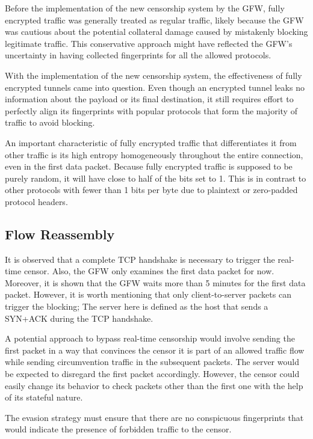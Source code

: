 Before the implementation of the new censorship system by the GFW, fully encrypted traffic was generally treated as regular traffic, likely because the GFW was cautious about the potential collateral damage caused by mistakenly blocking legitimate traffic. This conservative approach might have reflected the GFW's uncertainty in having collected fingerprints for all the allowed protocols.

With the implementation of the new censorship system, the effectiveness of fully encrypted tunnels came into question. Even though an encrypted tunnel leaks no information about the payload or its final destination, it still requires effort to perfectly align its fingerprints with popular protocols that form the majority of traffic to avoid blocking.

An important characteristic of fully encrypted traffic that differentiates it from other traffic is its high entropy homogeneously throughout the entire connection, even in the first data packet. Because fully encrypted traffic is supposed to be purely random, it will have close to half of the bits set to 1. This is in contrast to other protocols with fewer than 1 bits per byte due to plaintext or zero-padded protocol headers.\cite{wu2023great}

\subsection{Flow Reassembly}
It is observed that a complete TCP handshake is necessary to trigger the real-time censor. Also, the GFW only examines the first data packet for now. Moreover, it is shown that the GFW waits more than 5 minutes for the first data packet. However, it is worth mentioning that only client-to-server packets can trigger the blocking; The server here is defined as the host that sends a SYN+ACK during the TCP handshake.\cite{wu2023great}

A potential approach to bypass real-time censorship would involve sending the first packet in a way that convinces the censor it is part of an allowed traffic flow while sending circumvention traffic in the subsequent packets. The server would be expected to disregard the first packet accordingly. However, the censor could easily change its behavior to check packets other than the first one with the help of its stateful nature.

The evasion strategy must ensure that there are no conspicuous fingerprints that would indicate the presence of forbidden traffic to the censor.

